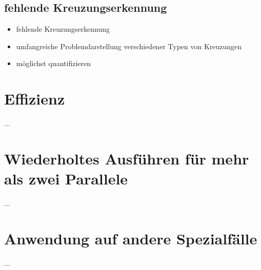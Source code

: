 \documentclass[../main/thesis.tex]{subfiles}
\begin{document}




\subsection{fehlende Kreuzungserkennung}

\begin{itemize}
\item fehlende Kreuzungserkennung
\item umfangreiche Problemdarstellung verschiedener Typen von Kreuzungen
\item möglichst quantifizieren
\end{itemize}



\section{Effizienz}

...



\section{Wiederholtes Ausführen für mehr als zwei Parallele}

...



\section{Anwendung auf andere Spezialfälle}

...



\end{document}
